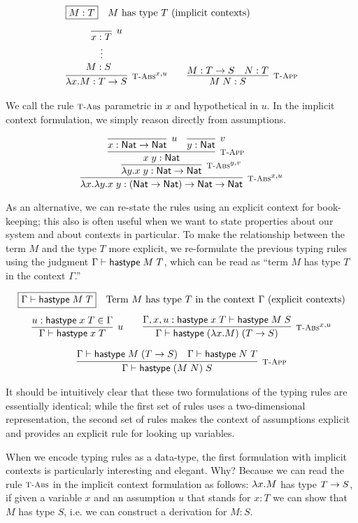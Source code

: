 \[
\begin{array}{c@{\qquad}c}
\multicolumn{2}{l}{ \fbox{$M:T$} \quad \mbox{$M$ has type $T$ (implicit contexts)}} \\[1em]
\infer[\TFn^{x,u}]{\lam x.M : T \arrow S}
                 {\hypo{\quad\infer[u]{x:T}{}}{M:S~~}} &
\infer[\TApp]{M\;N : S}{M : T \arrow S & N:T}
\end{array}
\]

We call the rule $\textsc{\footnotesize T-Abs}$ parametric in $x$ and hypothetical in $u$.
In the implicit context formulation, we simply reason directly from
assumptions.


\[
\infer[\TFn^{x,u}]{\lam x. \lam y. x \app y : (\Nat \arrow \Nat) \arrow \Nat \arrow \Nat}
{\infer[\TFn^{y,v}]{\lam y.x \app y : \Nat \arrow \Nat}{
 \infer[\TApp]{x \app y : \Nat}
   {\infer[u]{x:\Nat \arrow \Nat}{} &
    \infer[v]{y:\Nat}{}
   }
 }
}
\]

As an alternative, we can re-state the rules using an explicit context for
book-keeping; this also is often useful when we want to state properties about
our system and about contexts in particular. To make the
relationship between the term $M$ and the type $T$ more explicit, we
re-formulate the previous typing rules using the judgment $\Gamma
\vdash \mathsf{hastype}\;M\;T$, which can be read as ``term $M$ has type $T$
in the context $\Gamma$.''

\[
\begin{array}{c}
\multicolumn{1}{l}{\fbox{$\Gamma \vdash \tmhastype M
    T$}\quad\mbox{Term $M$ has type $T$ in the context $\Gamma$
    (explicit contexts)} }
\\[1em]
\infer[u]{\Gamma \vdash \tmhastype x T}{u:\tmhastype x T \in \Gamma} \qquad
\infer[\TFn^{x,u}]{\Gamma \vdash \tmhastype {(\lam x.M)} {(T \arrow S)}}
                 {\Gamma,x, u:\tmhastype x T \vdash \tmhastype M S}
\\[1em]
\infer[\TApp]{\Gamma \vdash \tmhastype {(M \app N)} S}
             {\Gamma \vdash \tmhastype M (T \arrow S)
  & \Gamma \vdash \tmhastype N T}
\end{array}
\]

It should be intuitively clear that these two formulations of the typing rules
are essentially identical; while the first set of rules uses a two-dimensional
representation, the second set of rules makes the context of
assumptions explicit and provides an explicit rule for looking up variables.

When we encode typing rules as a data-type, the first formulation with implicit
contexts is particularly interesting and elegant. Why? Because we can read the
rule $\textsc{\footnotesize T-Abs}$ in the implicit context formulation as follows: $\lambda x.M$ has type $T \rightarrow S$, if given a variable
$x$ and an assumption $u$ that stands for $x:T$ we can show that $M$ has type
$S$, i.e. we can construct a derivation for $M:S$.


